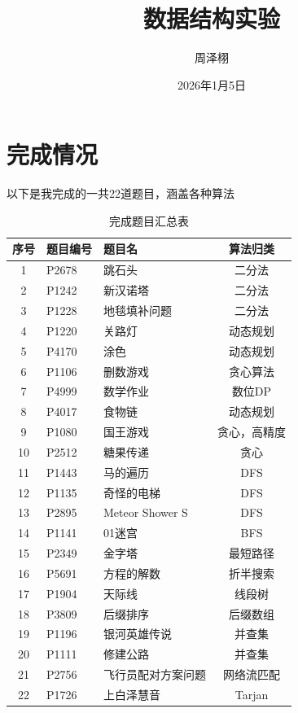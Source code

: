 \documentclass[supercite]{Experimental_Report}
\title{~~~~~~数据结构实验~~~~~~}
\author{周泽栩}
\date{2026年1月5日}
\theoremstyle{definition}
\begin{document}
\maketitle

\clearpage


\tableofcontents[level=2]

\clearpage


\section{完成情况}

以下是我完成的一共22道题目，涵盖各种算法

\begin{table}[htbp]
  \centering
  \caption{完成题目汇总表}
  \begin{tabular}{cllc} %
    \toprule
    序号 & 题目编号 & 题目名 & 算法归类 \\
    \midrule
    1 & P2678 & 跳石头 & 二分法 \\
    2 & P1242 & 新汉诺塔 & 二分法 \\
    3 & P1228 & 地毯填补问题 & 二分法 \\
    4 & P1220 & 关路灯 & 动态规划 \\
    5 & P4170 & 涂色 & 动态规划 \\
    6 & P1106 & 删数游戏 & 贪心算法 \\
    7 & P4999 & 数学作业 & 数位DP \\
    8 & P4017 & 食物链 & 动态规划 \\
    9 & P1080 & 国王游戏 & 贪心，高精度 \\
    10 & P2512 & 糖果传递 & 贪心 \\
    11 & P1443 & 马的遍历 & DFS \\
    12 & P1135 & 奇怪的电梯 & DFS \\
    13 & P2895 & Meteor Shower S & DFS \\
    14 & P1141 & 01迷宫 & BFS \\
    15 & P2349 & 金字塔 & 最短路径 \\
    16 & P5691 & 方程的解数 & 折半搜索 \\
    17 & P1904 & 天际线 & 线段树 \\
    18 & P3809 & 后缀排序 & 后缀数组 \\
    19 & P1196 & 银河英雄传说 & 并查集 \\
    20 & P1111 & 修建公路 & 并查集 \\
    21 & P2756 & 飞行员配对方案问题 & 网络流匹配 \\
    22 & P1726 & 上白泽慧音 & Tarjan \\
    \bottomrule
  \end{tabular}
  \label{tab:completed_problems}
\end{table}
\end{document}
